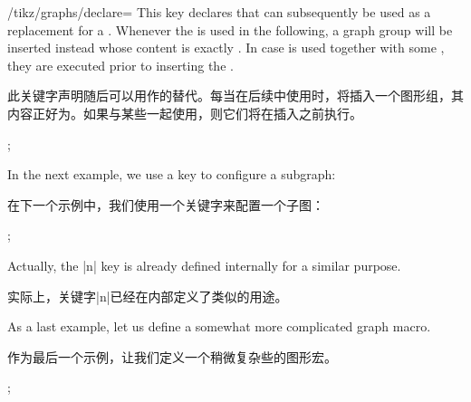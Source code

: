 \begin{key}{/tikz/graphs/declare=}
    This key declares that  can subsequently be used as a
    replacement for a . Whenever the  is used
    in the following, a graph group will be inserted instead whose content is
    exactly . In case  is used together
    with some , they are executed prior to inserting the
    .
    
    此关键字声明随后可以用作的替代。每当在后续中使用时，将插入一个图形组，其内容正好为。如果与某些一起使用，则它们将在插入之前执行。

\begin{codeexample}[preamble={\usetikzlibrary{graphs}}]
\tikz {};
\end{codeexample}
    In the next example, we use a key to configure a subgraph:
    
    在下一个示例中，我们使用一个关键字来配置一个子图：
\begin{codeexample}[preamble={\usetikzlibrary{graphs}}]
\tikz {};
\end{codeexample}
    Actually, the |n| key is already defined internally for a similar purpose.

    实际上，关键字|n|已经在内部定义了类似的用途。

    As a last example, let us define a somewhat more complicated graph macro.
    
    作为最后一个示例，让我们定义一个稍微复杂些的图形宏。
\begin{codeexample}[preamble={\usetikzlibrary{graphs}}]
\newcount\mycount
{}
\tikz {};
\end{codeexample}
\end{key}

